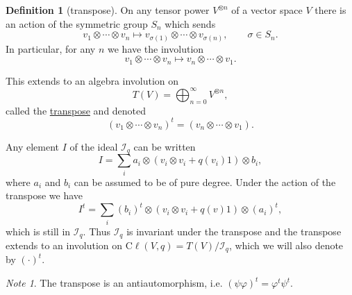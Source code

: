 \documentclass[a4paper,10pt]{scrreprt}
\newcommand{\defn}[1]{\ul{#1}}
\newcommand{\cliff}{\mathrm{C}\ell}
\theoremstyle{definition}
\newtheorem{definition}{Definition}[section]
\theoremstyle{plain}
\theoremstyle{remark}
\newtheorem{note}{Note}[section]
\begin{document}
\begin{definition}[transpose]
  \label{def:transpose}
  On any tensor power $V^{\otimes n}$ of a vector space $V$ there is an action of the symmetric group $S_{n}$ which sends
  \begin{equation*}
    v_{1} \otimes \cdots \otimes v_{n} \mapsto v_{\sigma(1)} \otimes \cdots \otimes v_{\sigma(n)},\qquad \sigma \in S_{n}.
  \end{equation*}
  In particular, for any $n$ we have the involution
  \begin{equation*}
    v_{1} \otimes \cdots \otimes v_{n} \mapsto v_{n} \otimes \cdots \otimes v_{1}.
  \end{equation*}

  This extends to an algebra involution on
  \begin{equation*}
    T(V) = \bigoplus_{n=0}^{\infty} V^{\otimes n},
  \end{equation*}
  called the \defn{transpose} and denoted
  \begin{equation*}
    (v_{1} \otimes \cdots \otimes v_{n})^{t} = (v_{n} \otimes \cdots \otimes v_{1}).
  \end{equation*}

  Any element $I$ of the ideal $\mathscr{I}_{q}$ can be written
  \begin{equation*}
    I = \sum_{i} a_{i} \otimes\left( v_{i} \otimes v_{i} + q(v_{i})1 \right) \otimes b_{i},
  \end{equation*}
  where $a_{i}$ and $b_{i}$ can be assumed to be of pure degree. Under the action of the transpose we have 
  \begin{equation*}
    I^{t} = \sum_{i} (b_{i})^{t} \otimes \left( v_{i} \otimes v_{i} + q(v)1 \right) \otimes (a_{i})^{t},
  \end{equation*}
  which is still in $\mathscr{I}_{q}$. Thus $\mathscr{I}_{q}$ is invariant under the transpose and the transpose extends to an involution on $\cliff(V,q) = T(V) / \mathscr{I}_{q}$, which we will also denote by $(\cdot)^{t}$.
\end{definition}
\begin{note}
  The transpose is an antiautomorphism, i.e. $(\psi\varphi)^{t} = \varphi^{t}\psi^{t}$.
\end{note}
\end{document}
